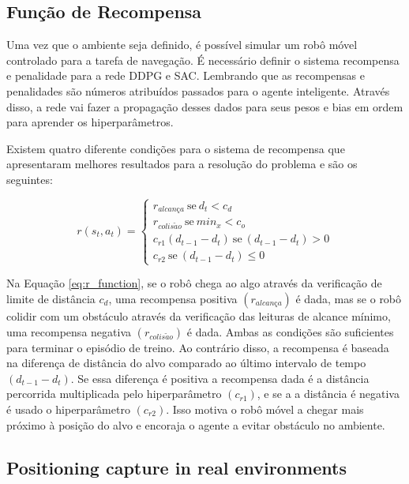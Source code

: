 \subsection{Função de Recompensa}

Uma vez que o ambiente seja definido, é possível simular um robô móvel controlado para a tarefa de navegação.
É necessário definir o sistema recompensa e penalidade para a rede DDPG e SAC.
Lembrando que as recompensas e penalidades são números atribuídos passados para o agente inteligente.
Através disso, a rede vai fazer a propagação desses dados para seus pesos e bias em ordem para aprender os hiperparâmetros.

Existem quatro diferente condições para o sistema de recompensa que apresentaram melhores resultados para a resolução do problema e são os seguintes:

\begin{equation}
r (s_t, a_t) = 
\begin{cases}
r_{alcan\textit{ç}a} \ \textrm{se} \ d_t < c_d
\\
r_{colis\tilde{a}o} \ \textrm{se}\ min_x < c_o
\\
c_{r1}(d_{t-1} - d_t) \ \textrm{se} \ (d_{t-1} - d_t) > 0
\\
c_{r2} \ \textrm{se} \ (d_{t-1} - d_t) \leq 0
\end{cases}
\label{eq:r_function}
\end{equation}

Na Equação \ref{eq:r_function}, se o robô chega ao algo através da verificação de limite de distância $c_d$, uma recompensa positiva $(r_{alcan\textit{ç}a})$ é dada, mas se o robô colidir com um obstáculo através da verificação das leituras de alcance mínimo, uma recompensa negativa $(r_{colis\tilde{a}o})$ é dada.
Ambas as condições são suficientes para terminar o episódio de treino.
Ao contrário disso, a recompensa é baseada na diferença de distância do alvo comparado ao último intervalo de tempo $(d_{t-1} - d_t)$.
Se essa diferença é positiva a recompensa dada é a distância percorrida multiplicada pelo hiperparâmetro $(c_{r1})$, e se a a distância é negativa é usado o hiperparâmetro $(c_{r2})$.
Isso motiva o robô móvel a chegar mais próximo à posição do alvo e encoraja o agente a evitar obstáculo no ambiente.

\subsection{Positioning capture in real environments}

